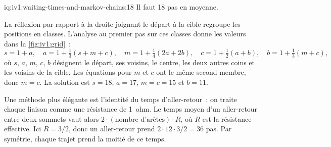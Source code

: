 \begin{solution}{iq:iv1:waiting-times-and-markov-chains:18}
Il faut 18 pas en moyenne.

La réflexion par rapport à la droite joignant le départ à la cible regroupe les positions en classes. L'analyse au premier pas sur ces classes donne les valeurs dans la \cref{fig:iv1:grid}~:
\[
s = 1 + a, \quad a = 1 + \tfrac13(s + m + c), \quad m = 1 + \tfrac14(2a + 2b), \quad c = 1 + \tfrac12(a + b), \quad b = 1 + \tfrac13(m + c),
\]
où $s$, $a$, $m$, $c$, $b$ désignent le départ, ses voisins, le centre, les deux autres coins et les voisins de la cible. Les équations pour $m$ et $c$ ont le même second membre, donc $m = c$. La solution est $s = 18$, $a = 17$, $m = c = 15$ et $b = 11$.

\begin{omfigure}

\label{fig:iv1:grid}
\end{omfigure}

Une méthode plus élégante est l'identité du temps d'aller-retour~: on traite chaque liaison comme une résistance de 1~ohm. Le temps moyen d'un aller-retour entre deux sommets vaut alors $2 \cdot (\text{nombre d'arêtes}) \cdot R$, où $R$ est la résistance effective. Ici $R = 3/2$, donc un aller-retour prend $2 \cdot 12 \cdot 3/2 = 36$ pas. Par symétrie, chaque trajet prend la moitié de ce temps.

\end{solution}

